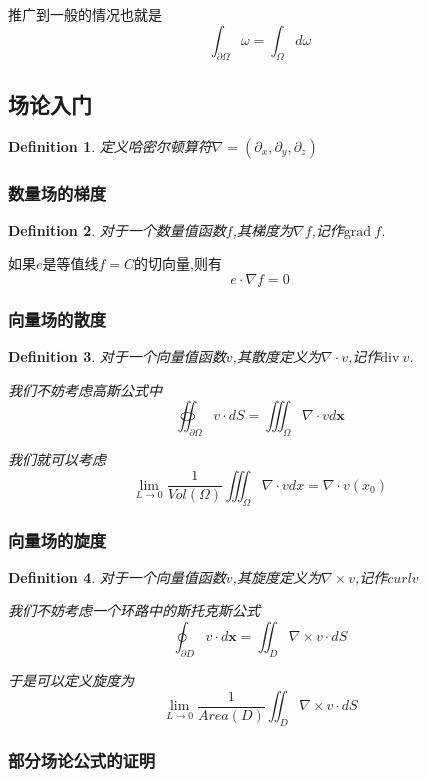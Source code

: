 \documentclass[11pt,hyperref,a4paper,UTF8]{ctexart}
\newtheorem{definition}{Definition}[subsection]
\newcommand{\ve}{\boldsymbol}
\begin{document}
\begin{CJK}{UTF8}{gkai}
推广到一般的情况也就是
\[\int_{\partial \Omega} \omega = \int_\Omega d\omega\]

\subsection{场论入门}

\begin{definition}
  定义哈密尔顿算符$\nabla = (\partial_x, \partial_y,\partial_z)$
\end{definition}
\subsubsection{数量场的梯度}
\begin{definition}
对于一个数量值函数$f$,其梯度为$\nabla f$,记作$\text{grad}~ f$.

\end{definition}
如果$e$是等值线$f = C$的切向量,则有
\[e \cdot \nabla f = 0\]

\subsubsection{向量场的散度}
\begin{definition}
  对于一个向量值函数$v$,其散度定义为$\nabla \cdot v$,记作$\text{div}~ v$.

  我们不妨考虑高斯公式中
  \[\oiint_{\partial \Omega} v \cdot dS = \iiint_{\Omega} \nabla \cdot v d\ve{x}\]

  我们就可以考虑
  \[\lim_{L \to 0} \frac{1}{Vol(\Omega)} \iiint_{\Omega} \nabla \cdot v dx = \nabla \cdot v(x_0)\]
\end{definition}

\subsubsection{向量场的旋度}
\begin{definition}
  对于一个向量值函数$v$,其旋度定义为$\nabla \times v$,记作$curl v$

  我们不妨考虑一个环路中的斯托克斯公式
  \[ \oint_{\partial D} v\cdot d\ve{x} = \iint_D \nabla \times v \cdot dS\]

  于是可以定义旋度为
  \[\lim_{L \to 0}\frac{1}{Area(D)} \iint_{D} \nabla \times v\cdot dS\]
\end{definition}

\subsubsection{部分场论公式的证明}


\end{CJK}
\end{document}
